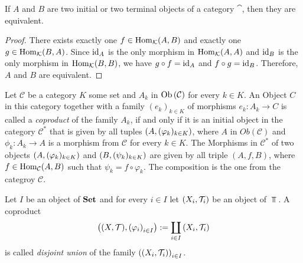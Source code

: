 \begin{theorem} \cite[p. 83]{Alg1&2}
	If $A$ and $B$ are two initial or two terminal objects of a category $\cat$, then they are equivalent. 
\end{theorem}
\begin{proof}
	There exists exactly one $f \in \operatorname{Hom}_\mathcal K(A, B)$ and exactly one $g \in \operatorname{Hom}_\mathcal K(B,A)$. Since $\operatorname{id}_A$ is the only morphism in $\operatorname{Hom}_\mathcal K(A, A)$ and $\operatorname{id}_B$ is the only morphism in $\operatorname{Hom}_\mathcal K(B, B)$, we have $g \circ f = \operatorname{id}_A$ and $f \circ g = \operatorname{id}_B$. Therefore, $A$ and $B$ are equivalent. 
\end{proof}

\begin{definition}
	Let $\mathcal{C}$ be a category $K$ some set and $A_k$ in $\operatorname{Ob}{\left ( \mathcal{C} \right )}$ for every $k \in K$. An Object $C$ in this category together with a family $(e_k)_{k \in K}$ of morphisms $e_k: A_k \to C$ is called a \textit{coproduct} of the family $A_k$, if and only if it is an initial object in the category $\mathcal{C}^\ast$ that is given by all tuples ${\left ( A, (\varphi_k)_{k \in K} \right )}$, where $A$ in $Ob(\mathcal{C})$ and $\phi_k: A_k \to A$ is a morphism from $\mathcal{C}$ for every $k \in K$. The Morphisms in $\mathcal{C}^\ast$ of two objects ${\left ( A, (\varphi_k)_{k \in K} \right )}$ and ${\left ( B, (\psi_k)_{k \in K} \right )}$ are given by all triple $(A, f, B)$, where $f \in \operatorname{Hom}_\mathcal C(A, B)$ such that $\psi_k = f \circ \varphi_k$. The composition is the one from the categroy $\mathcal{C}$. 
\end{definition}

\begin{definition}
	Let $I$ be an object of $\mathbf{Set}$ and for every $i \in I$ let ${\left ( X_i, \mathcal{T}_i \right )}$ be an object of $\Top$. A coproduct 
	\begin{align*}
	\pbraces{\tspace, \pbraces{\varphi_i}_{i \in I}} := \coprod_{i \in I} \pbraces{X_i, \Tc_i}
	\end{align*}
	is called \textit{disjoint union} of the family ${\left ( {\left ( X_i, \mathcal{T}_i \right )} \right )}_{i \in I}$.
\end{definition}

